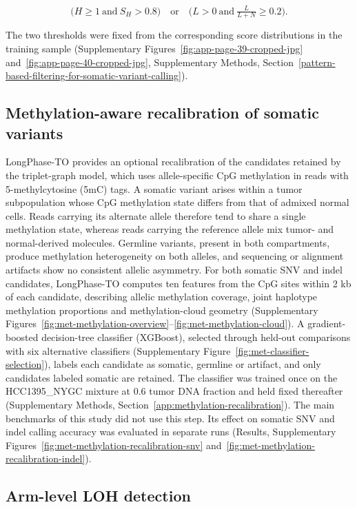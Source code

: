 \documentclass[unnumsec,webpdf,contemporary,large]{oup-authoring-template}
\begin{document}
\[
\bigl(H\geq1\ \text{and}\ S_H>0.8\bigr)
\quad\text{or}\quad
\bigl(L>0\ \text{and}\ \tfrac{L}{L+N}\geq0.2\bigr).
\]

The two thresholds were fixed from the corresponding score distributions in the training sample (Supplementary Figures~\ref{fig:app-page-39-cropped-jpg} and~\ref{fig:app-page-40-cropped-jpg}, Supplementary Methods, Section~\ref{pattern-based-filtering-for-somatic-variant-calling}).

\subsection{Methylation-aware recalibration of somatic variants}

LongPhase-TO provides an optional recalibration of the candidates retained by the triplet-graph model, which uses allele-specific CpG methylation in reads with 5-methylcytosine (5mC) tags. A somatic variant arises within a tumor subpopulation whose CpG methylation state differs from that of admixed normal cells. Reads carrying its alternate allele therefore tend to share a single methylation state, whereas reads carrying the reference allele mix tumor- and normal-derived molecules. Germline variants, present in both compartments, produce methylation heterogeneity on both alleles, and sequencing or alignment artifacts show no consistent allelic asymmetry. For both somatic SNV and indel candidates, LongPhase-TO computes ten features from the CpG sites within 2 kb of each candidate, describing allelic methylation coverage, joint haplotype methylation proportions and methylation-cloud geometry (Supplementary Figures~\ref{fig:met-methylation-overview}--\ref{fig:met-methylation-cloud}). A gradient-boosted decision-tree classifier (XGBoost), selected through held-out comparisons with six alternative classifiers (Supplementary Figure~\ref{fig:met-classifier-selection}), labels each candidate as somatic, germline or artifact, and only candidates labeled somatic are retained. The classifier was trained once on the HCC1395\_NYGC mixture at 0.6 tumor DNA fraction and held fixed thereafter (Supplementary Methods, Section~\ref{app:methylation-recalibration}). The main benchmarks of this study did not use this step. Its effect on somatic SNV and indel calling accuracy was evaluated in separate runs (Results, Supplementary Figures~\ref{fig:met-methylation-recalibration-snv} and~\ref{fig:met-methylation-recalibration-indel}).

\subsection{Arm-level LOH detection}
\end{document}
